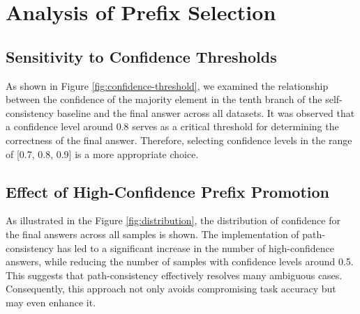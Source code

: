 
\section{Analysis of Prefix Selection}
\label{app:prefix-selection-analysis}

\subsection{Sensitivity to Confidence Thresholds}
\label{app:confidence-threshold}

As shown in Figure \ref{fig:confidence-threshold}, we examined the relationship between the confidence of the majority element in the tenth branch of the self-consistency baseline and the final answer across all datasets. It was observed that a confidence level around 0.8 serves as a critical threshold for determining the correctness of the final answer. Therefore, selecting confidence levels in the range of [0.7, 0.8, 0.9] is a more appropriate choice.

\subsection{Effect of High-Confidence Prefix Promotion}
\label{app:high-confidence}

As illustrated in the Figure \ref{fig:distribution}, the distribution of confidence for the final answers across all samples is shown. The implementation of path-consistency has led to a significant increase in the number of high-confidence answers, while reducing the number of samples with confidence levels around 0.5. This suggests that path-consistency effectively resolves many ambiguous cases. Consequently, this approach not only avoids compromising task accuracy but may even enhance it.

